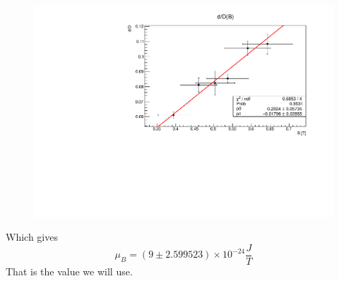 \documentclass[a4paper,12pt,abstracton]{scrartcl}
\begin{document}
\begin{figure}[H]
\centering
\hspace*{-1.5cm}    
\includegraphics[trim=0cm 0cm 1.5cm 0cm,clip,width=17cm,keepaspectratio]{zatbs.pdf}
\end{figure}
Which gives 
\begin{equation*}
\mu_B =(9 \pm 2.599523 ) \times 10^{-24} \frac{J}{T}
\end{equation*}
That is the value we will use.
\end{document}
